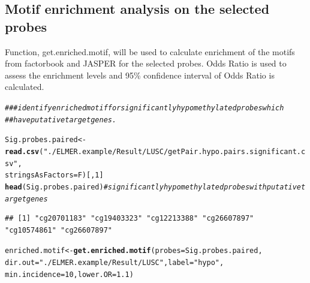 \documentclass{article}\usepackage[]{graphicx}\usepackage[]{color}
\makeatletter
\newcommand{\hlnum}[1]{\textcolor[rgb]{0.686,0.059,0.569}{#1}}%
\newcommand{\hlstr}[1]{\textcolor[rgb]{0.192,0.494,0.8}{#1}}%
\newcommand{\hlcom}[1]{\textcolor[rgb]{0.678,0.584,0.686}{\textit{#1}}}%
\newcommand{\hlstd}[1]{\textcolor[rgb]{0.345,0.345,0.345}{#1}}%
\newcommand{\hlkwb}[1]{\textcolor[rgb]{0.69,0.353,0.396}{#1}}%
\newcommand{\hlkwc}[1]{\textcolor[rgb]{0.333,0.667,0.333}{#1}}%
\newcommand{\hlkwd}[1]{\textcolor[rgb]{0.737,0.353,0.396}{\textbf{#1}}}%
\newenvironment{kframe}{%
 \def\at@end@of@kframe{}%
 \ifinner\ifhmode%
  \def\at@end@of@kframe{\end{minipage}}%
  \begin{minipage}{\columnwidth}%
 \fi\fi%
 \def\FrameCommand##1{\hskip\@totalleftmargin \hskip-\fboxsep
 \colorbox{shadecolor}{##1}\hskip-\fboxsep
     \hskip-\linewidth \hskip-\@totalleftmargin \hskip\columnwidth}%
 \MakeFramed {\advance\hsize-\width
   \@totalleftmargin\z@ \linewidth\hsize
   \@setminipage}}%
 {\par\unskip\endMakeFramed%
 \at@end@of@kframe}
\newenvironment{knitrout}{}{} %
\makeatother
\begin{document}
\subsection{Motif enrichment analysis on the selected probes}
Function, get.enriched.motif, will be used to calculate enrichment of the motifs from 
factorbook and JASPER for the selected probes. Odds Ratio is used to assess 
the enrichment levels and 95\% confidence interval of Odds Ratio is calculated.
\begin{knitrout}
\color{fgcolor}\begin{kframe}
\begin{alltt}
\hlcom{### identify enriched motif for significantly hypomethylated probes which }
\hlcom{##have putative target genes.}

\hlstd{Sig.probes.paired} \hlkwb{<-} \hlkwd{read.csv}\hlstd{(}\hlstr{"./ELMER.example/Result/LUSC/getPair.hypo.pairs.significant.csv"}\hlstd{,}
                              \hlkwc{stringsAsFactors}\hlstd{=F)[,}\hlnum{1}\hlstd{]}
\hlkwd{head}\hlstd{(Sig.probes.paired)} \hlcom{# significantly hypomethylated probes with putative target genes}
\end{alltt}
\begin{verbatim}
## [1] "cg20701183" "cg19403323" "cg12213388" "cg26607897" "cg10574861" "cg26607897"
\end{verbatim}
\begin{alltt}
\hlstd{enriched.motif} \hlkwb{<-}\hlkwd{get.enriched.motif}\hlstd{(}\hlkwc{probes}\hlstd{=Sig.probes.paired,}
                                    \hlkwc{dir.out}\hlstd{=}\hlstr{"./ELMER.example/Result/LUSC"}\hlstd{,} \hlkwc{label}\hlstd{=}\hlstr{"hypo"}\hlstd{,}
                                    \hlkwc{min.incidence} \hlstd{=} \hlnum{10}\hlstd{,}\hlkwc{lower.OR} \hlstd{=} \hlnum{1.1}\hlstd{)}
\end{alltt}



\end{kframe}
\end{knitrout}
\end{document}
